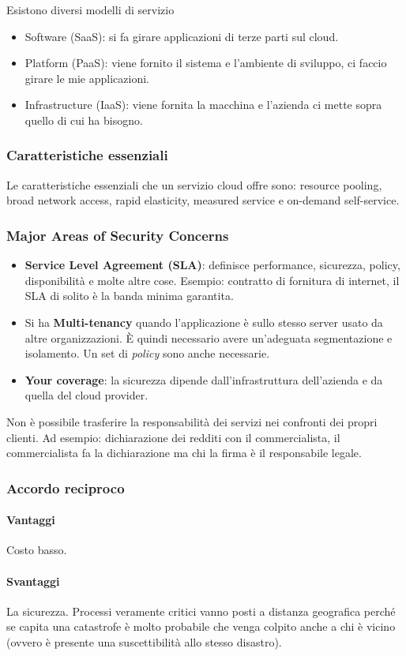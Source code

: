Esistono diversi modelli di servizio
\begin{itemize}
  \item Software (SaaS): si fa girare applicazioni di terze parti sul cloud.
  \item Platform (PaaS): viene fornito il sistema e l'ambiente di sviluppo, ci
  faccio girare le mie applicazioni.
  \item Infrastructure (IaaS): viene fornita la macchina e l'azienda ci mette
  sopra quello di cui ha bisogno.
\end{itemize}

\subsubsection{Caratteristiche essenziali}

Le caratteristiche essenziali che un servizio cloud offre sono: resource 
pooling, broad network access, rapid elasticity, measured service e on-demand 
self-service.

\subsubsection{Major Areas of Security Concerns}

\begin{itemize}
 \item \textbf{Service Level Agreement (SLA)}: definisce performance,
sicurezza, policy, disponibilità e molte altre cose. Esempio: contratto di
fornitura di internet, il SLA di solito è la banda minima garantita.
 \item Si ha \textbf{Multi-tenancy} quando l'applicazione è sullo stesso server
usato da altre organizzazioni. È quindi necessario avere un'adeguata
segmentazione e isolamento. Un set di \textit{policy} sono anche necessarie.
 \item \textbf{Your coverage}: la sicurezza dipende dall'infrastruttura
dell'azienda e da quella del cloud provider.
\end{itemize}

Non è possibile trasferire la responsabilità dei servizi nei confronti dei
propri clienti. Ad esempio: dichiarazione dei redditi con il commercialista, il
commercialista fa la dichiarazione ma chi la firma è il responsabile legale.

\subsubsection{Accordo reciproco}

\paragraph*{Vantaggi} Costo basso.

\paragraph*{Svantaggi} La sicurezza. Processi veramente critici vanno posti a
distanza geografica perché se capita una catastrofe è molto probabile che venga
colpito anche a chi è vicino (ovvero è presente una suscettibilità allo stesso
disastro).
